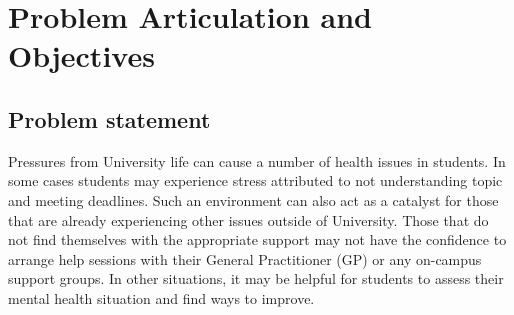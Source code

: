 \section{Problem Articulation and Objectives}

\subsection{Problem statement}



Pressures from University life can cause a number of health issues in students.
In some cases students may experience stress attributed to not understanding topic and meeting deadlines.
Such an environment can also act as a catalyst for those that are already experiencing other issues outside of University.
Those that do not find themselves with the appropriate support may not have the confidence to arrange help sessions with their
General Practitioner (GP) or any on-campus support groups. 
In other situations, it may be helpful for students to assess their mental health situation and find ways to improve.

